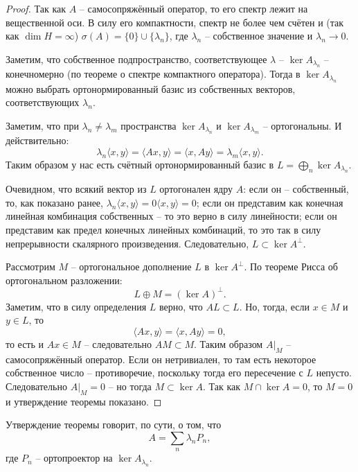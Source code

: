 \begin{proof}
    Так как $A$ -- самосопряжённый оператор, то его спектр лежит на вещественной оси.
    В силу его компактности, спектр не более чем счётен и (так как $\dim H = \infty$) $\sigma(A) = \{0\} \cup \{\lambda_n\}$, где $\lambda_n$ -- собственное значение и $\lambda_n \rightarrow 0$.

    Заметим, что собственное подпространство, соответствующее $\lambda$ -- $\ker A_{\lambda_n}$ -- конечномерно (по теореме о спектре компактного оператора). Тогда в $\ker A_{\lambda_n}$ можно выбрать ортонормированный базис из собственных векторов, соответствующих $\lambda_n$.

    Заметим, что при $\lambda_n \neq \lambda_m$ пространства $\ker A_{\lambda_n}$ и $\ker A_{\lambda_m}$ -- ортогональны.
    И действительно:
    \[
        \lambda_n \langle x, y \rangle = \langle Ax, y \rangle = \langle x, Ay \rangle = \lambda_m \langle x, y \rangle.
    \]
    Таким образом у нас есть счётный ортонормированный базис в $L = \bigoplus_{n} \ker A_{\lambda_n}$.
    
    Очевидном, что всякий вектор из $L$ ортогонален ядру $A$: если он -- собственный, то, как показано ранее, $\lambda_n\langle x, y \rangle = 0\langle x, y \rangle = 0$; если он представим как конечная линейная комбинация собственных -- то это верно в силу линейности; если он представим как предел конечных линейных комбинаций, то это так в силу непрерывности скалярного произведения. Следовательно, $L \subset \ker A^\perp$.

    Рассмотрим $M$ -- ортогональное дополнение $L$ в $\ker A^\perp$.
    По теореме Рисса об ортогональном разложении:
    \[
        L \oplus M = (\ker A)^{\perp}.
    \]
    Заметим, что в силу определения $L$ верно, что $AL \subset L$.
    Но, тогда, если $x \in M$ и $y \in L$, то
    \[
        \langle Ax, y \rangle = \langle x, Ay \rangle = 0,
    \]
    то есть и $Ax \in M$ -- следовательно $AM \subset M$.
    Таким образом $A|_{M}$ -- самосопряжённый оператор.
    Если он нетривиален, то там есть некоторое собственное число -- противоречие, поскольку тогда его пересечение с $L$ непусто.
    Следовательно $A|_{M} = 0$ -- но тогда $M \subset \ker A$.
    Так как $M \cap \ker A = 0$, то $M = 0$ и утверждение теоремы показано.
\end{proof}

\begin{note}
    Утверждение теоремы говорит, по сути, о том, что 
    \[
        A = \sum_{n} \lambda_n P_n,
    \]
    где $P_n$ -- ортопроектор на $\ker A_{\lambda_n}$.
\end{note}

